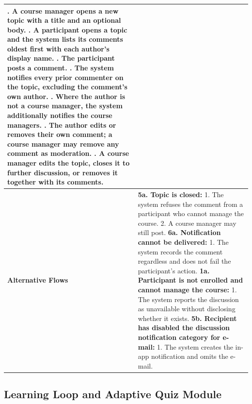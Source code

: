 \begin{longtable}{|>{\raggedright\arraybackslash}p{}|>{\raggedright\arraybackslash}p{}|}
3. A course manager opens a new topic with a title and an optional body. \newline
4. A participant opens a topic and the system lists its comments oldest first with each author's display name. \newline
5. The participant posts a comment. \newline
6. The system notifies every prior commenter on the topic, excluding the comment's own author. \newline
7. Where the author is not a course manager, the system additionally notifies the course managers. \newline
8. The author edits or removes their own comment; a course manager may remove any comment as moderation. \newline
9. A course manager edits the topic, closes it to further discussion, or removes it together with its comments. \\ \hline
\textbf{Alternative Flows} &
\textbf{5a. Topic is closed:} \newline
\hspace*{1em}1. The system refuses the comment from a participant who cannot manage the course. \newline
\hspace*{1em}2. A course manager may still post. \newline
\textbf{6a. Notification cannot be delivered:} \newline
\hspace*{1em}1. The system records the comment regardless and does not fail the participant's action. \newline
\textbf{1a. Participant is not enrolled and cannot manage the course:} \newline
\hspace*{1em}1. The system reports the discussion as unavailable without disclosing whether it exists. \newline
\textbf{5b. Recipient has disabled the discussion notification category for e-mail:} \newline
\hspace*{1em}1. The system creates the in-app notification and omits the e-mail. \\
\end{longtable}

\subsection{Learning Loop and Adaptive Quiz Module}

